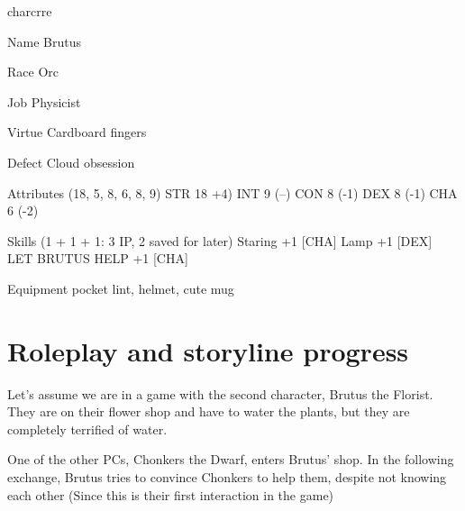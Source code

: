 \begin{labeling}{charcrre}
\item [Name] Brutus
\item [Race] Orc
\item [Job] Physicist
\item [Virtue] Cardboard fingers
\item [Defect] Cloud obsession
\item [Attributes] (18, 5, 8, 6, 8, 9) \linebreak
STR 18 +4)\linebreak
INT 9  (--)\linebreak
CON 8  (-1)\linebreak
DEX 8  (-1)\linebreak
CHA 6  (-2)\linebreak
\item [Skills] (1 + 1 + 1: 3 IP, 2 saved for later)\linebreak
Staring +1 [CHA]\linebreak
Lamp +1 [DEX]\linebreak
LET BRUTUS HELP +1 [CHA]
\item [Equipment] pocket lint, helmet, cute mug
\end{labeling}

\section{Roleplay and storyline progress}

Let's assume we are in a game with the second character, Brutus the Florist. They are on their flower shop and have to water the plants, but they are completely terrified of water. 
\par
One of the other PCs, Chonkers the Dwarf, enters Brutus' shop. In the following exchange, Brutus tries to convince Chonkers to help them, despite not knowing each other (Since this is their first interaction in the game)
\par

